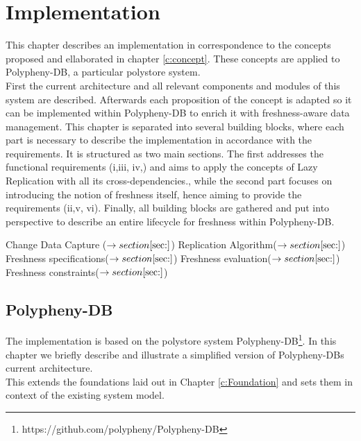 \chapter{Implementation}
\label{c:implementation}

This chapter describes an implementation in correspondence to the concepts proposed and ellaborated in chapter \ref{c:concept}. 
These concepts are applied to Polypheny-DB, a particular polystore system.\\
First the current architecture and all relevant components and modules of this system are described. Afterwards each proposition of the concept is adapted
so it can be implemented within Polypheny-DB to enrich it with freshness-aware data management.
This chapter is separated into several building blocks, where each part is necessary to describe the implementation in accordance with the requirements.
It is structured as two main sections. The first addresses the functional requirements (i,iii, iv,) and aims to apply the concepts of Lazy Replication with all its
cross-dependencies., while the second part focuses on introducing the notion of freshness itself, hence aiming to provide the requirements (ii,v, vi).
Finally, all building blocks are gathered and put into perspective to describe an entire lifecycle for freshness within Polypheny-DB. 



Change Data Capture ($\rightarrow section \ref{sec:}$)
Replication Algorithm($\rightarrow section \ref{sec:}$)
Freshness specifications($\rightarrow section \ref{sec:}$)
Freshness evaluation($\rightarrow section \ref{sec:}$)
Freshness constraints($\rightarrow section \ref{sec:}$)









\section{Polypheny-DB}
\label{sec:architecture}


The implementation is based on the polystore system Polypheny-DB\footnote{https://github.com/polypheny/Polypheny-DB}.
In this chapter we briefly describe and illustrate a simplified version of Polypheny-DBs current architecture.\\
This extends the foundations laid out in Chapter \ref{c:Foundation} and sets them in context of the existing system model.


